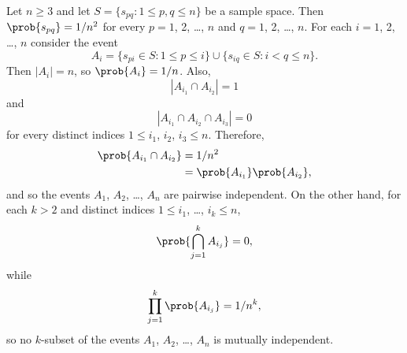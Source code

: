 Let $n\ge3$ and let $S=\{s_{pq}:1\le p,q\le n\}$ be a sample space.
Then $\prob{s_{pq}}=1/n^2$ for every $p=1$, 2, \dots, $n$ and $q=1$, 2, \dots, $n$.
For each $i=1$, 2, \dots, $n$ consider the event
\[
    A_i = \{s_{pi}\in S:1\le p\le i\}\cup\{s_{iq}\in S:i<q\le n\}.
\]
Then $|A_i|=n$, so $\prob{A_i}=1/n$.
Also,
\[
    |A_{i_1}\cap A_{i_2}| = 1
\]
and
\[
    |A_{i_1}\cap A_{i_2}\cap A_{i_3}| = 0
\]
for every distinct indices $1\le i_1$, $i_2$, $i_3\le n$.
Therefore,
\begin{align*}
    \prob{A_{i_1}\cap A_{i_2}} &= 1/n^2 \\
    &= \prob{A_{i_1}}\prob{A_{i_2}},
\end{align*}
and so the events $A_1$, $A_2$, \dots, $A_n$ are pairwise independent.
On the other hand, for each $k>2$ and distinct indices $1\le i_1$, \dots, $i_k\le n$,
\[
    \prob{\bigcap_{j=1}^kA_{i_j}} = 0,
\]
while
\[
    \prod_{j=1}^k\prob{A_{i_j}} = 1/n^k,
\]
so no $k$-subset of the events $A_1$, $A_2$, \dots, $A_n$ is mutually independent.
